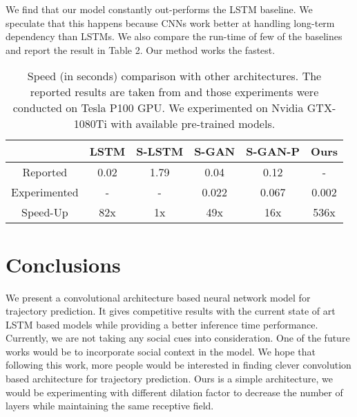 \documentclass[runningheads]{llncs}
\begin{document}
We find that our model constantly out-performs the LSTM baseline. We speculate that this happens because CNNs work better at handling long-term dependency than LSTMs. We also compare the run-time of few of the baselines and report the result in Table 2. Our method works the fastest. 




\begin{table}[h]
\centering
\begin{tabular}{|c| c | c | c | c | c |} 
 \hline
  & \textbf{LSTM} & \textbf{S-LSTM} & \textbf{S-GAN} & \textbf{S-GAN-P} & \textbf{Ours} \\
 \hline\hline
Reported & 0.02 & 1.79  &0.04 & 0.12& -\\ 
Experimented & - & - & 0.022 & 0.067 & 0.002 \\
Speed-Up & 82x & 1x & 49x & 16x & 536x \\ 
 \hline
 \hline
\end{tabular}
\caption{Speed (in seconds) comparison with other architectures. The reported results are taken from \cite{gupta2018social} and those experiments were conducted on Tesla P100 GPU. We experimented on Nvidia GTX-1080Ti with available pre-trained models.}
\label{table:2}
\end{table}




\section{Conclusions}

We present a convolutional architecture based neural network model for trajectory prediction. It gives competitive results with the current state of art LSTM based models while providing a better inference time performance. Currently, we are not taking any social cues into consideration. One of the future works would be to incorporate social context in the model. We hope that following this work, more people would be interested in finding clever convolution based architecture for trajectory prediction. Ours is a simple architecture, we would be experimenting with different dilation factor to decrease the number of layers while maintaining the same receptive field.




\end{document}
